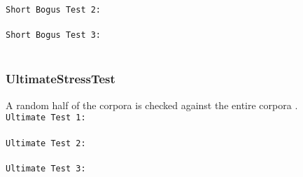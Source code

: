 \begin{description}
\texttt{Short Bogus Test 2:}\\
\\

\texttt{Short Bogus Test 3:}\\
\\

\subsubsection{UltimateStressTest}
A random half of the corpora is checked against the entire corpora .\\
\texttt{Ultimate Test 1:}\\
\\

\texttt{Ultimate Test 2:}\\
\\

\texttt{Ultimate Test 3:}\\
\\

\end{description}

